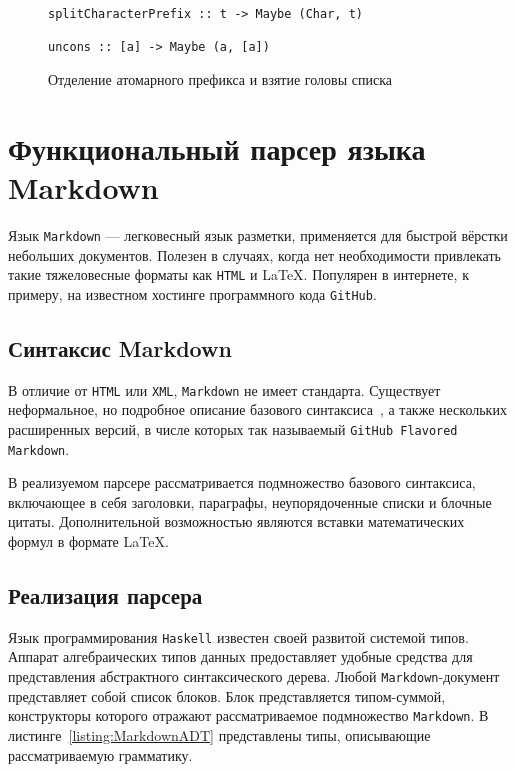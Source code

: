 \begin{figure}[h]
\begin{lstlisting}
splitCharacterPrefix :: t -> Maybe (Char, t)

uncons :: [a] -> Maybe (a, [a])
\end{lstlisting}
\caption{Отделение атомарного префикса и взятие головы списка}
\label{listing:Monoid}
\end{figure}

\chapter{Функциональный парсер языка Markdown}

Язык \lstinline{Markdown} --- легковесный язык разметки, применяется для быстрой
вёрстки небольших документов. Полезен в случаях, когда нет необходимости привлекать
такие тяжеловесные форматы как \lstinline{HTML} и \LaTeX. Популярен в
интернете, к примеру, на известном хостинге программного кода
\lstinline{GitHub}.

\section{Синтаксис Markdown}

В отличие от \lstinline{HTML} или \lstinline{XML}, \lstinline{Markdown} не имеет
стандарта. Существует неформальное, но подробное описание базового
синтаксиса~\cite{markdownSyntax}, а также нескольких расширенных версий, в
числе которых так называемый \lstinline{GitHub Flavored Markdown}.

В реализуемом парсере рассматривается подмножество базового синтаксиса,
включающее в себя заголовки, параграфы, неупорядоченные списки и блочные цитаты.
Дополнительной возможностью являются вставки математических формул в формате
\LaTeX.

\section{Реализация парсера}

Язык программирования \lstinline{Haskell} известен своей развитой системой
типов. Аппарат алгебраических типов данных предоставляет удобные средства для
представления абстрактного синтаксического дерева. Любой
\lstinline{Markdown}-документ представляет собой список блоков. Блок
представляется типом-суммой, конструкторы которого отражают рассматриваемое
подмножество \lstinline{Markdown}. В листинге~\ref{listing:MarkdownADT}
представлены типы, описывающие рассматриваемую грамматику.

